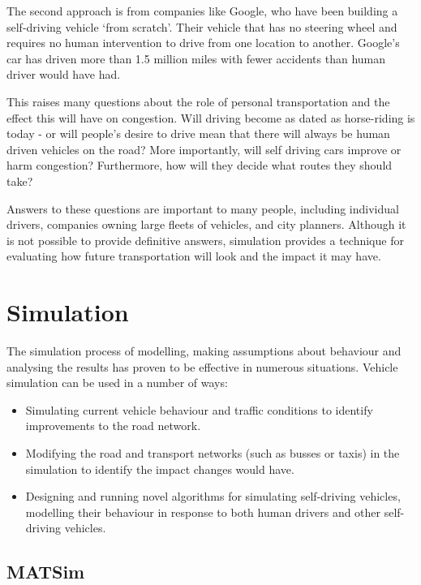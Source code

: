 \documentclass[ %
                    author={Alexander Hill},
                supervisor={Dr. Benjamin Sach},
                    degree={MEng},
                     title={MARMOSET},
                  subtitle={Multi-Agent Route Management using Online Simulation for Efficient Transportation},
                      type={research},
                      year={2016} ]{dissertation}
\begin{document}
The second approach is from companies like Google, who have been building a
self-driving vehicle `from scratch'. Their vehicle that has no steering wheel
and requires no human intervention to drive from one location to another.
Google's car has driven more than 1.5 million miles with fewer accidents than
human driver would have had.

This raises many questions about the role of personal transportation and the
effect this will have on congestion. Will driving become as dated as
horse-riding is today - or will people's desire to drive mean that there will
always be human driven vehicles on the road? More importantly, will self driving
cars improve or harm congestion? Furthermore, how will they decide what routes
they should take?

Answers to these questions are important to many people, including individual
drivers, companies owning large fleets of vehicles, and city planners. Although
it is not possible to provide definitive answers, simulation provides a
technique for evaluating how future transportation will look and the impact it
may have.

\section{Simulation}

The simulation process of modelling, making assumptions about behaviour and
analysing the results has proven to be effective in numerous situations.
Vehicle simulation can be used in a number of ways:

\begin{itemize}
    \item Simulating current vehicle behaviour and traffic conditions to
        identify improvements to the road network.
    \item Modifying the road and transport networks (such as busses or taxis) in
        the simulation to identify the impact changes would have.
    \item Designing and running novel algorithms for simulating self-driving
        vehicles, modelling their behaviour in response to both human drivers
        and other self-driving vehicles.
\end{itemize}

\subsection{MATSim}
\end{document}
